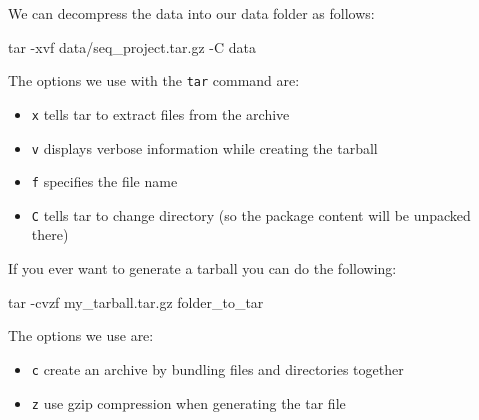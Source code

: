 \documentclass[
  letterpaper,
  DIV=11,
  numbers=noendperiod]{scrreprt}
\newenvironment{Shaded}{}{}
\newcommand{\AttributeTok}[1]{\textcolor[rgb]{0.84,0.23,0.29}{#1}}
\newcommand{\FunctionTok}[1]{\textcolor[rgb]{0.44,0.26,0.76}{#1}}
\newcommand{\NormalTok}[1]{\textcolor[rgb]{0.14,0.16,0.18}{#1}}
\providecommand{\tightlist}{%
  \setlength{\itemsep}{0pt}\setlength{\parskip}{0pt}}\usepackage{longtable,booktabs,array}
\begin{document}
We can decompress the data into our data folder as follows:

\begin{Shaded}
\begin{Highlighting}[]
\FunctionTok{tar} \AttributeTok{{-}xvf}\NormalTok{ data/seq\_project.tar.gz }\AttributeTok{{-}C}\NormalTok{ data}
\end{Highlighting}
\end{Shaded}

The options we use with the \texttt{tar} command are:

\begin{itemize}
\tightlist
\item
  \texttt{x} tells tar to extract files from the archive
\item
  \texttt{v} displays verbose information while creating the tarball
\item
  \texttt{f} specifies the file name
\item
  \texttt{C} tells tar to change directory (so the package content will
  be unpacked there)
\end{itemize}

\begin{tcolorbox}[enhanced jigsaw, breakable, left=2mm, opacitybacktitle=0.6, coltitle=black, toprule=.15mm, colframe=quarto-callout-tip-color-frame, opacityback=0, bottomtitle=1mm, rightrule=.15mm, colback=white, toptitle=1mm, leftrule=.75mm, titlerule=0mm, bottomrule=.15mm, title=\textcolor{quarto-callout-tip-color}{\faLightbulb}\hspace{0.5em}{Tip: how to generate a tarball}, colbacktitle=quarto-callout-tip-color!10!white, arc=.35mm]

If you ever want to generate a tarball you can do the following:

\begin{Shaded}
\begin{Highlighting}[]
\FunctionTok{tar} \AttributeTok{{-}cvzf}\NormalTok{ my\_tarball.tar.gz folder\_to\_tar}
\end{Highlighting}
\end{Shaded}

The options we use are:

\begin{itemize}
\tightlist
\item
  \texttt{c} create an archive by bundling files and directories
  together
\item
  \texttt{z} use gzip compression when generating the tar file
\end{itemize}

\end{tcolorbox}
\end{document}
